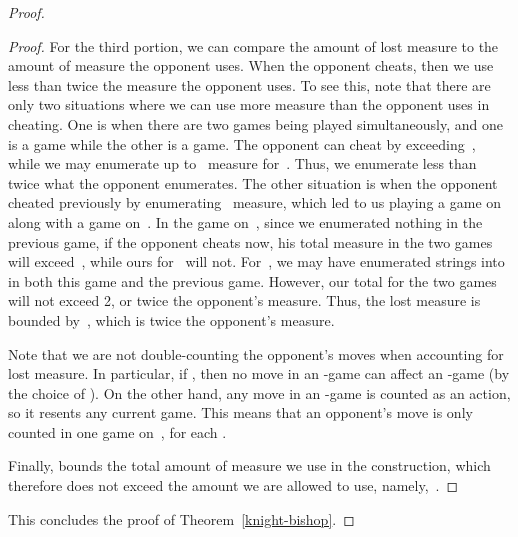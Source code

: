 \documentclass{LMCS}
\newcommand{\0}{\mathbf{0}}
\newcommand{\<}{\langle}
\renewcommand{\>}{\rangle}
\begin{document}
\begin{proof}
\begin{proof}
For the third portion, we can compare the amount of lost measure to the
amount of measure the opponent uses.  When the opponent cheats, then we use
less than twice the measure the opponent uses.  To see this, note that there
are only two situations where we can use more measure than the opponent uses
in cheating.  One is when there are two games being played simultaneously,
and one is a  game while the other is a
 game.  The opponent can cheat by exceeding~,
while we may enumerate up to~ measure for~.  Thus, we enumerate
less than twice what the opponent enumerates.  The other situation is when
the opponent cheated previously by enumerating~ measure, which led
to us playing a  game on~ along with a
 game on~.  In the game on~,
since we enumerated nothing in the previous game, if the opponent cheats now,
his total measure in the two games will exceed~, while ours
for~ will not.  For~, we may have enumerated strings into~ in
both this game and the previous game.  However, our total for the two games
will not exceed 2, or twice the opponent's measure.  Thus, the
lost measure is bounded by~, which is twice the opponent's measure.

Note that we are not double-counting the opponent's moves when accounting for
lost measure. In particular, if , then no move in an
-game can affect an -game (by the choice of
). On the other hand, any move in an -game is
counted as an  action, so it resents any current
 game. This means that an opponent's move is only counted in
one game on~, for each .

Finally,  bounds the total amount of measure we use in
the construction, which therefore does not exceed the amount we are
allowed to use, namely,~.
\end{proof}

This concludes the proof of Theorem~\ref{knight-bishop}.
\end{proof}
\end{document}
